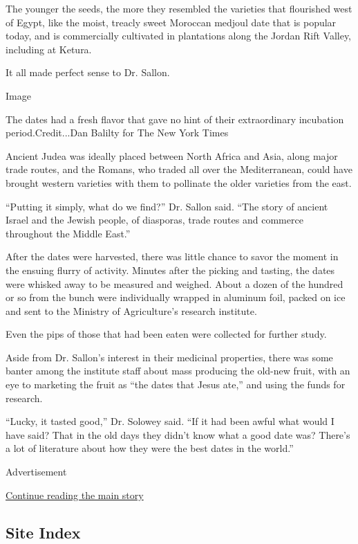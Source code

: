 The younger the seeds, the more they resembled the varieties that
flourished west of Egypt, like the moist, treacly sweet Moroccan medjoul
date that is popular today, and is commercially cultivated in
plantations along the Jordan Rift Valley, including at Ketura.

It all made perfect sense to Dr. Sallon.

Image

The dates had a fresh flavor that gave no hint of their extraordinary
incubation period.Credit...Dan Balilty for The New York Times

Ancient Judea was ideally placed between North Africa and Asia, along
major trade routes, and the Romans, who traded all over the
Mediterranean, could have brought western varieties with them to
pollinate the older varieties from the east.

``Putting it simply, what do we find?'' Dr. Sallon said. ``The story of
ancient Israel and the Jewish people, of diasporas, trade routes and
commerce throughout the Middle East.''

After the dates were harvested, there was little chance to savor the
moment in the ensuing flurry of activity. Minutes after the picking and
tasting, the dates were whisked away to be measured and weighed. About a
dozen of the hundred or so from the bunch were individually wrapped in
aluminum foil, packed on ice and sent to the Ministry of Agriculture's
research institute.

Even the pips of those that had been eaten were collected for further
study.

Aside from Dr. Sallon's interest in their medicinal properties, there
was some banter among the institute staff about mass producing the
old-new fruit, with an eye to marketing the fruit as ``the dates that
Jesus ate,'' and using the funds for research.

``Lucky, it tasted good,'' Dr. Solowey said. ``If it had been awful what
would I have said? That in the old days they didn't know what a good
date was? There's a lot of literature about how they were the best dates
in the world.''

Advertisement

\protect\hyperlink{after-bottom}{Continue reading the main story}

\hypertarget{site-index}{%
\subsection{Site Index}\label{site-index}}

